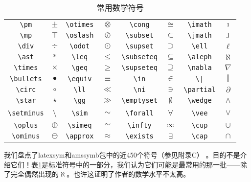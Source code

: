 \begin{table}[hbt]
  \centering
  \begin{tabular}{cccccccc}
    \verb+\pm+       & $\pm$  & \verb+\otimes+      &  $\otimes$ & 
    \verb+\cong+     & $\cong$  & \verb+\imath+     &  $\imath$     \\
    \verb+\mp+       & $\mp$  & \verb+\oslash+      &  $\oslash$ &  
    \verb+\subset+   & $\subset$  & \verb+\jmath+   &  $\jmath$     \\
    \verb+\div+      & $\div$  & \verb+\odot+       &  $\odot$     & 
    \verb+\supset+   & $\supset$  & \verb+\ell+     &  $\ell$         \\
    \verb+\ast+      & $\ast$  & \verb+\leq+        &  $\leq$       & 
    \verb+\subseteq+ & $\subseteq$  & \verb+\aleph+ &  $\aleph$     \\
    \verb+\times+    & $\times$  & \verb+\geq+      &  $\geq$       & 
    \verb+\supseteq+ & $\supseteq$  & \verb+\nabla+ &  $\nabla$     \\
    \verb+\bullets+  & $\bullet$  & \verb+\equiv+   &  $\equiv$   & 
    \verb+\in+       & $\in$      & \verb+\|+       &  $\|$         \\
    \verb+\circ+     & $\circ$  & \verb+\ll+        &  $\ll$         & 
    \verb+\ni+       & $\ni$    & \verb+\partial+   &  $\partial$  \\
    \verb+\star+     & $\star$  & \verb+\gg+     &  $\gg$         & 
    \verb+\emptyset+ & $\emptyset$  & \verb+\wedge+ &  $\wedge$     \\
    \verb+\setminus+ & \backslash & \verb+\sim+ &  $\sim$       & %
    \verb+\forall+   & $\forall$  & \verb+\vee+   &  $\vee$         \\
    \verb+\oplus+    & $\oplus$  & \verb+\simeq+    &  $\simeq$   & 
    \verb+\infty+    & $\infty$  & \verb+\cup+    &  $\cup$         \\
    \verb+\ominus+   & $\ominus$  & \verb+\approx+   &  $\approx$ & 
    \verb+\exists+   & $\exists$  & \verb+\cap+   &  $\cap$   
  \end{tabular}
  \caption{常用数学符号}
  \label{tab:3.1}
\end{table}

\begin{ii}
我们盘点了latexsym和amssymb包中的近450个符号（参见附录C）%
。目的不是介绍它们！表\ref{tab:3.1}是标准符号中的一部分，我们认为它们可能是最常用的那一批——除了完全偶然出现的$\aleph$。也许这证明了作者的数学水平不太高。
\end{ii}

